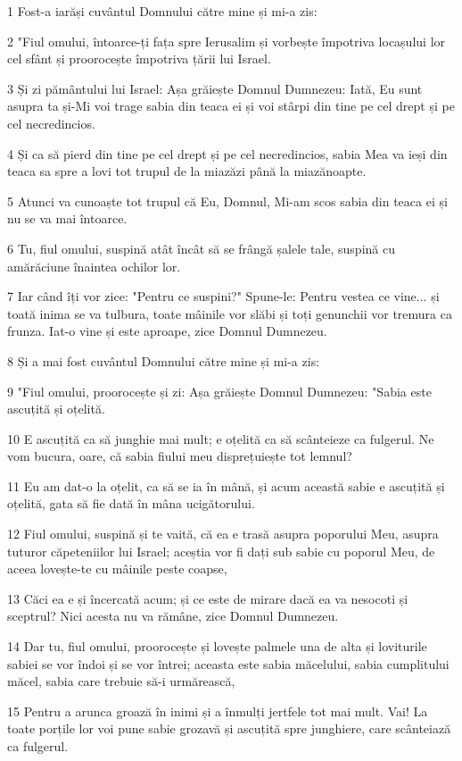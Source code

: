 \par 1 Fost-a iarăși cuvântul Domnului către mine și mi-a zis:
\par 2 "Fiul omului, întoarce-ți fața spre Ierusalim și vorbește împotriva locașului lor cel sfânt și proorocește împotriva țării lui Israel.
\par 3 Și zi pământului lui Israel: Așa grăiește Domnul Dumnezeu: Iată, Eu sunt asupra ta și-Mi voi trage sabia din teaca ei și voi stârpi din tine pe cel drept și pe cel necredincios.
\par 4 Și ca să pierd din tine pe cel drept și pe cel necredincios, sabia Mea va ieși din teaca sa spre a lovi tot trupul de la miazăzi până la miazănoapte.
\par 5 Atunci va cunoaște tot trupul că Eu, Domnul, Mi-am scos sabia din teaca ei și nu se va mai întoarce.
\par 6 Tu, fiul omului, suspină atât încât să se frângă șalele tale, suspină cu amărăciune înaintea ochilor lor.
\par 7 Iar când îți vor zice: "Pentru ce suspini?" Spune-le: Pentru vestea ce vine... și toată inima se va tulbura, toate mâinile vor slăbi și toți genunchii vor tremura ca frunza. Iat-o vine și este aproape, zice Domnul Dumnezeu.
\par 8 Și a mai fost cuvântul Domnului către mine și mi-a zis:
\par 9 "Fiul omului, proorocește și zi: Așa grăiește Domnul Dumnezeu: "Sabia este ascuțită și oțelită.
\par 10 E ascuțită ca să junghie mai mult; e oțelită ca să scânteieze ca fulgerul. Ne vom bucura, oare, că sabia fiului meu disprețuiește tot lemnul?
\par 11 Eu am dat-o la oțelit, ca să se ia în mână, și acum această sabie e ascuțită și oțelită, gata să fie dată în mâna ucigătorului.
\par 12 Fiul omului, suspină și te vaită, că ea e trasă asupra poporului Meu, asupra tuturor căpeteniilor lui Israel; aceștia vor fi dați sub sabie cu poporul Meu, de aceea lovește-te cu mâinile peste coapse,
\par 13 Căci ea e și încercată acum; și ce este de mirare dacă ea va nesocoti și sceptrul? Nici acesta nu va rămâne, zice Domnul Dumnezeu.
\par 14 Dar tu, fiul omului, proorocește și lovește palmele una de alta și loviturile sabiei se vor îndoi și se vor întrei; aceasta este sabia măcelului, sabia cumplitului măcel, sabia care trebuie să-i urmărească,
\par 15 Pentru a arunca groază în inimi și a înmulți jertfele tot mai mult. Vai! La toate porțile lor voi pune sabie grozavă și ascuțită spre junghiere, care scânteiază ca fulgerul.
